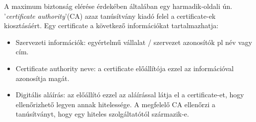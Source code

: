 A maximum biztonság elérése érdekében általában egy harmadik-oldali ún. ’\textit{certificate authority}’(CA) azaz tanúsítvány kiadó felel a certificate-ek kiosztásáért. Egy certificate a következő információkat tartalmazhatja:
\begin{itemize}
	\item Szervezeti információk: egyértelmű vállalat / szervezet azonosítók pl név vagy cím.
	\item Certificate authority neve: a certificate előállítója ezzel az információval azonosítja magát.
	\item Digitális aláírás: az előállító ezzel az aláírással látja el a certificate-et, hogy ellenőrizhető legyen annak hitelessége. A megfelelő CA ellenőrzi a tanúsítványt, hogy egy hiteles szolgáltatótól származik-e.
\end{itemize}
